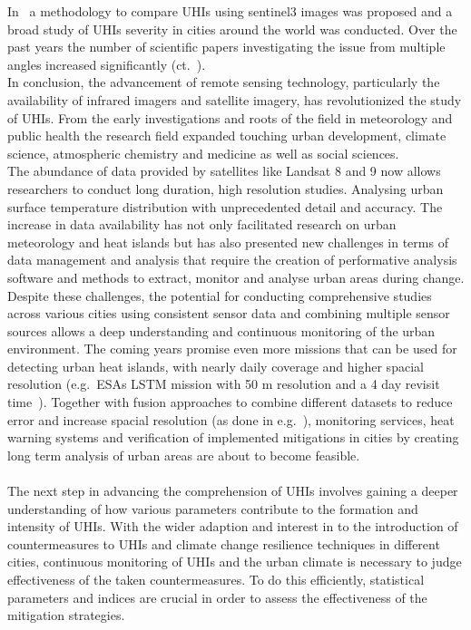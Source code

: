 \documentclass[12pt,a4paper, english,twoside]{scrartcl}
\begin{document}
  In~\cite{Sobrino2020} a methodology to compare \glspl{UHI} using \gls{sentinel3} images was proposed and a broad study of \glspl{UHI} severity in cities around the world was conducted.
  Over the past years the number of scientific papers investigating the issue from multiple angles increased significantly (ct.~\cite[P. 3]{Piracha2022b}).\\
  In conclusion, the advancement of remote sensing technology, particularly the availability of infrared imagers and satellite imagery, has revolutionized the study of \glspl{UHI}. 
  From the early investigations and roots of the field in meteorology and public health the research field expanded touching urban development, climate science, atmospheric chemistry and medicine as well as social sciences.\\
  The abundance of data provided by satellites like Landsat 8 and 9 now allows researchers to conduct long duration, high resolution studies.
  Analysing urban surface temperature distribution with unprecedented detail and accuracy.
  The increase in data availability has not only facilitated research on urban meteorology and heat islands but has also presented new challenges in terms of data management and analysis that require the creation of performative analysis software and methods to extract, monitor and analyse urban areas during change.\\
  Despite these challenges, the potential for conducting comprehensive studies across various cities using consistent sensor data and combining multiple sensor sources allows a deep understanding and continuous monitoring of the urban environment.
  The coming years promise even more missions that can be used for detecting urban heat islands, with nearly daily coverage and higher spacial resolution (e.g.~ESAs LSTM mission with 50 m resolution and a 4 day revisit time~\cite{CEOS2024}). 
  Together with fusion approaches to combine different datasets to reduce error and increase spacial resolution (as done in e.g.~\cite{CampsValls2009}), monitoring services, heat warning systems and verification of implemented mitigations in cities by creating long term analysis of urban areas are about to become feasible.\\ \\ 
  The next step in advancing the comprehension of \glspl{UHI} involves gaining a deeper understanding of how various parameters contribute to the formation and intensity of \glspl{UHI}.
  With the wider adaption and interest in to the introduction of countermeasures to \glspl{UHI} and climate change resilience techniques in different cities, continuous monitoring of \glspl{UHI} and the urban climate is necessary to judge effectiveness of the taken countermeasures.
  To do this efficiently, statistical parameters and indices are crucial in order to assess the effectiveness of the mitigation strategies. 
\end{document}
